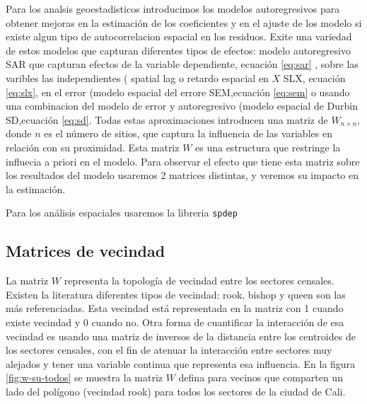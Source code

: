 \documentclass[12pt,]{book}
\begin{document}
Para los analsis geoestadisticos introducimos los modelos autoregresivos
para obtener mejoras en la estimación de los coeficientes y en el ajuste
de los modelo si existe algun tipo de autocorrelacion espacial en los
residuos. Exite una variedad de estos modelos que capturan diferentes
tipos de efectos: modelo autoregresivo SAR que capturan efectos de la
variable dependiente, ecuación \eqref{eq:sar} , sobre las varibles las
independientes ( spatial lag o retardo espacial en \(X\) SLX, ecuación
\eqref{eq:slx}, en el error (modelo espacial del errore SEM,ecuación
\eqref{eq:sem} o usando una combinacion del modelo de error y
autoregresivo (modelo espacial de Durbin SD,ecuación \eqref{eq:sd}. Todas
estas aproximaciones introducen una matriz de \(W_{n \times n}\), donde
\(n\) es el número de sitios, que captura la influencia de las variables
en relación con su proximidad. Esta matriz \(W\) es una estructura que
restringe la influecia a priori en el modelo. Para observar el efecto
que tiene esta matriz sobre los resultados del modelo usaremos 2
matrices distintas, y veremos su impacto en la estimación.

Para los análisis espaciales usaremos la libreria \texttt{spdep}
\citep{R-spdep}

\subsection{Matrices de vecindad}\label{matrices-de-vecindad}

La matriz \(W\) representa la topología de vecindad entre los sectores
censales. Existen la literatura diferentes tipos de vecindad: rook,
bishop y queen son las más referenciadas. Esta vecindad está
representada en la matriz con 1 cuando existe vecindad y 0 cuando no.
Otra forma de cuantificar la interacción de esa vecindad es usando una
matriz de inversos de la distancia entre los centroides de los sectores
censales, con el fin de atenuar la interacción entre sectores muy
alejados y tener una variable continua que representa esa influencia. En
la figura \ref{fig:w-su-todos} se muestra la matriz \(W\) defina para
vecinos que comparten un lado del polígono (vecindad rook) para todos
los sectores de la ciudad de Cali.
\end{document}
